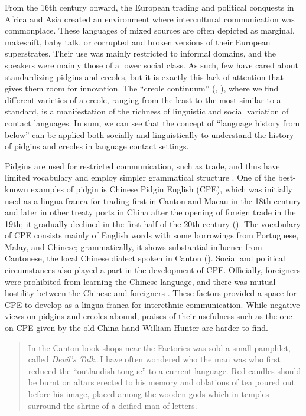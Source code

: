 \documentclass[english,output=paper,colorlinks,citecolor=brown]{../langscibook}
\begin{document}
From the 16th century onward, the European trading and political conquests in Africa and Asia created an environment where intercultural communication was commonplace. These languages of mixed sources are often depicted as marginal, makeshift, baby talk, or corrupted and broken versions of their European superstrates. Their use was mainly restricted to informal domains, and the speakers were mainly those of a lower social class. As such, few have cared about standardizing pidgins and creoles, but it is exactly this lack of attention that gives them room for innovation. The “creole continuum” (\citealt{StewartEtAl1965}, \citealt{Bickerton1975}), where we find different varieties of a creole, ranging from the least to the most similar to a standard, is a manifestation of the richness of linguistic and social variation of contact languages. In sum, we can see that the concept of “language history from below” can be applied both socially and linguistically to understand the history of pidgins and creoles in language contact settings. 

Pidgins are used for restricted communication, such as trade, and thus have limited vocabulary and employ simpler grammatical structure \citep[5]{Holm2000}. One of the best-known examples of pidgin is Chinese Pidgin English (CPE), which was initially used as a lingua franca for trading first in Canton and Macau in the 18th century and later in other treaty ports in China after the opening of foreign trade in the 19th; it gradually declined in the first half of the 20th century (\citealt{MatthewsLi2013}). The vocabulary of CPE consists mainly of English words with some borrowings from Portuguese, Malay, and Chinese; grammatically, it shows substantial influence from Cantonese, the local Chinese dialect spoken in Canton (\citealt{AnsaldoEtAl2010}). Social and political circumstances also played a part in the development of CPE. Officially, foreigners were prohibited from learning the Chinese language, and there was mutual hostility between the Chinese and foreigners \citep{Baker1990}. These factors provided a space for CPE to develop as a lingua franca for interethnic communication. While negative views on pidgins and creoles abound, praises of their usefulness such as the one on CPE given by the old China hand William Hunter are harder to find.

\begin{quote}
    In the Canton book-shops near the Factories was sold a small pamphlet, called \textit{Devil’s Talk}…I have often wondered who the man was who first reduced the ``outlandish tongue'' to a current language. Red candles should be burnt on altars erected to his memory and oblations of tea poured out before his image, placed among the wooden gods which in temples surround the shrine of a deified man of letters. \citep[63]{Hunter1882}  
\end{quote}
\end{document}
